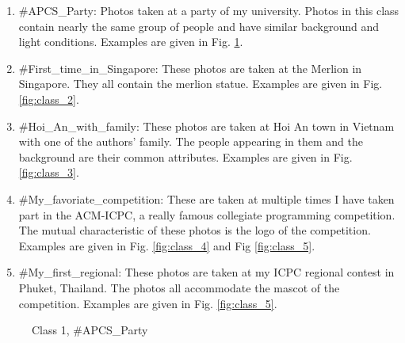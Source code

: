 \begin{enumerate}

\item \#APCS\_Party: Photos taken at a party of my university. Photos in this class contain nearly the same group of people and have similar background and light conditions. Examples are given in Fig. \ref{fig:class_1}.
\item \#First\_time\_in\_Singapore: These photos are taken at the Merlion in Singapore. They all contain the merlion statue. Examples are given in Fig. \ref{fig:class_2}.
\item \#Hoi\_An\_with\_family: These photos are taken at Hoi An town in Vietnam with one of the authors' family. The people appearing in them and the background are their common attributes. Examples are given in Fig. \ref{fig:class_3}.
\item \#My\_favoriate\_competition: These are taken at multiple times I have taken part in the ACM-ICPC, a really famous collegiate programming competition. The mutual characteristic of these photos is the logo of the competition. Examples are given in Fig. \ref{fig:class_4} and Fig \ref{fig:class_5}.
\item \#My\_first\_regional: These photos are taken at my ICPC regional contest in Phuket, Thailand. The photos all accommodate the mascot of the competition. Examples are given in Fig. \ref{fig:class_5}.

\end{enumerate}

\begin{figure}
    \centering
    \caption{Class 1, \#APCS\_Party}
    \label{fig:class_1}
\end{figure}

